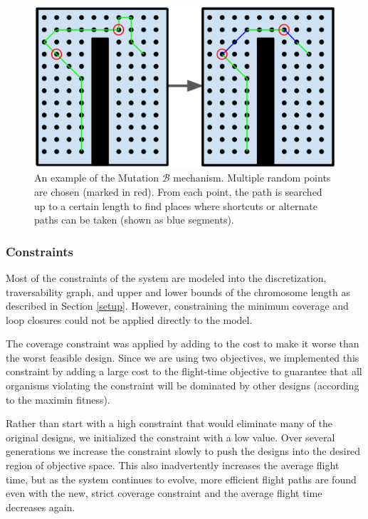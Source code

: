 \documentclass[letterpaper, 10 pt, conference]{ieeeconf}  %
\begin{document}
\begin{figure}
\centering
\includegraphics[width=1.0\linewidth]{muterpolation.png}
\caption[An example of the coverage planner Mutation $\mathcal{B}$ mechanism]{An example of the Mutation $\mathcal{B}$ mechanism. Multiple random points are chosen (marked in red). From each point, the path is searched up to a certain length to find places where shortcuts or alternate paths can be taken (shown as blue segments).}
\label{fig:muterpolation}
\end{figure}

\subsubsection{Constraints}\label{constraints}

Most of the constraints of the system are modeled into the discretization, traversability graph, and upper and lower bounds of the chromosome length as described in Section \ref{setup}. However, constraining the minimum coverage and loop closures could not be applied directly to the model.

The coverage constraint was applied by adding to the cost to make it worse than the worst feasible design. Since we are using two objectives, we implemented this constraint by adding a large cost to the flight-time objective to guarantee that all organisms violating the constraint will be dominated by other designs (according to the maximin fitness).

Rather than start with a high constraint that would eliminate many of the original designs, we initialized the constraint with a low value. Over several generations we increase the constraint slowly to push the designs into the desired region of objective space. This also inadvertently increases the average flight time, but as the system continues to evolve, more efficient flight paths are found even with the new, strict coverage constraint and the average flight time decreases again.
\end{document}
